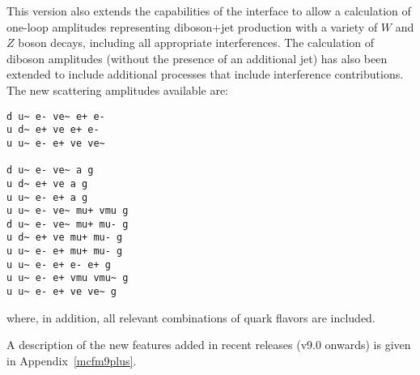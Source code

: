 This version also extends the capabilities of the interface to allow a calculation
of one-loop amplitudes representing diboson+jet production with
a variety of $W$ and $Z$ boson decays, including all appropriate interferences.
The calculation of diboson amplitudes (without the presence of an additional
jet) has also been extended to include additional processes that include
interference contributions.
The new scattering amplitudes available are:
\begin{lstlisting}
d u~ e- ve~ e+ e-
u d~ e+ ve e+ e-
u u~ e- e+ ve ve~

d u~ e- ve~ a g
u d~ e+ ve a g
u u~ e- e+ a g
u u~ e- ve~ mu+ vmu g
d u~ e- ve~ mu+ mu- g
u d~ e+ ve mu+ mu- g
u u~ e- e+ mu+ mu- g
u u~ e- e+ e- e+ g
u u~ e- e+ vmu vmu~ g
u u~ e- e+ ve ve~ g
\end{lstlisting}
where, in addition, all relevant combinations of quark flavors are included.

A description of the new features added in recent releases (v9.0 onwards) is 
given in Appendix~\ref{mcfm9plus}.
